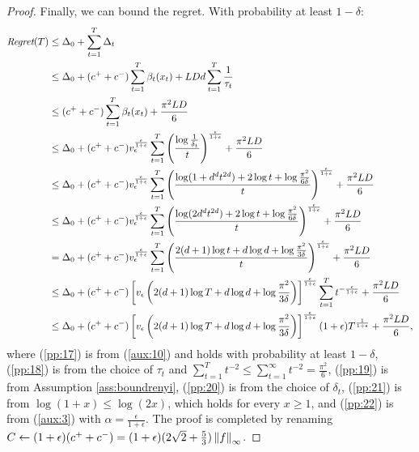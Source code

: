 \documentclass{article}
\begin{document}
\begin{proof}
	Finally, we can bound the regret. With probability at least $1-\delta$:
	\begin{align}
		\Reg(T) &\leq \Delta_0 + \sum_{t=1}^{T}\Delta_t \nonumber\\
		&\leq \Delta_0 + (c^{+}+c^{-})\sum_{t=1}^{T}\beta_t(x_t) + LDd\sum_{t=1}^{T}\frac{1}{\tau_t} \label{pp:17}\\
		&\leq (c^{+}+c^{-})\sum_{t=1}^{T}\beta_t(x_t) + \frac{\pi^2LD}{6} \label{pp:18}\\
		&\leq \Delta_0 + (c^{+}+c^{-})v_{\epsilon}^{\frac{\epsilon}{1+\epsilon}}\sum_{t=1}^{T}\left(\frac{\log\frac{1}{\delta_t}}{t}\right)^{\frac{\epsilon}{1+\epsilon}} + \frac{\pi^2LD}{6} \label{pp:19}\\
		&\leq \Delta_0 + (c^{+}+c^{-})v_{\epsilon}^{\frac{\epsilon}{1+\epsilon}}\sum_{t=1}^{T}\left(\frac{
			\log (1+d^dt^{2d}) + 2\log t + \log\frac{\pi^2}{6\delta}
		}{t}\right)^{\frac{\epsilon}{1+\epsilon}} + \frac{\pi^2LD}{6} \label{pp:20}\\
		&\leq \Delta_0 + (c^{+}+c^{-})v_{\epsilon}^{\frac{\epsilon}{1+\epsilon}}\sum_{t=1}^{T}\left(\frac{
		\log (2d^dt^{2d}) + 2\log t + \log\frac{\pi^2}{6\delta}
		}{t}\right)^{\frac{\epsilon}{1+\epsilon}} + \frac{\pi^2LD}{6} \label{pp:21}\\
		&= \Delta_0 + (c^{+}+c^{-})v_{\epsilon}^{\frac{\epsilon}{1+\epsilon}}\sum_{t=1}^{T}\left(\frac{
		2(d+1)\log t + d\log d + \log\frac{\pi^2}{3\delta}
		}{t}\right)^{\frac{\epsilon}{1+\epsilon}} + \frac{\pi^2LD}{6} \nonumber\\
		&\leq \Delta_0 + (c^{+}+c^{-})\left[v_{\epsilon}\left(
			2(d+1)\log T + d\log d + \log\frac{\pi^2}{3\delta}
		\right)\right]^{\frac{\epsilon}{1+\epsilon}}\sum_{t=1}^{T}
		t^{-\frac{\epsilon}{1+\epsilon}} + \frac{\pi^2LD}{6} 	\nonumber\\
		&\leq \Delta_0 + (c^{+}+c^{-})\left[v_{\epsilon}\left(
		2(d+1)\log T + d\log d + \log\frac{\pi^2}{3\delta}
		\right)\right]^{\frac{\epsilon}{1+\epsilon}}(1+\epsilon)T^{\frac{1}{1+\epsilon}}+ \frac{\pi^2LD}{6}, 	\label{pp:22}
	\end{align}
	where (\ref{pp:17}) is from (\ref{aux:10}) and holds with probability at least $1-\delta$, (\ref{pp:18}) is from the choice of $\tau_t$ and $\sum_{t=1}^{T}t^{-2}\leq\sum_{t=1}^{\infty}t^{-2} = \frac{\pi^2}{6}$, (\ref{pp:19}) is from Assumption \ref{ass:boundrenyi}, (\ref{pp:20}) is from the choice of $\delta_t$, (\ref{pp:21}) is from $\log(1+x)\leq\log(2x)$, which holds for every $x\geq 1$, and (\ref{pp:22}) is from  (\ref{aux:3}) with $\alpha=\frac{\epsilon}{1+\epsilon}$. 
	The proof is completed by renaming $C\gets (1+\epsilon)(c^{+}+c^{-}) = (1+\epsilon)(2\sqrt{2} + \frac{5}{3})\norm[\infty]{f}$.
\end{proof}
\end{document}
